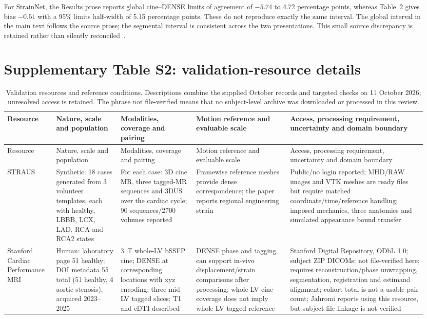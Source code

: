 \documentclass[11pt,a4paper]{article}
\begin{document}
For StrainNet, the Results prose reports global cine--DENSE limits of agreement of \(-5.74\) to 4.72 percentage points, whereas Table~2 gives bias \(-0.51\) with a 95\% limits half-width of 5.15 percentage points. These do not reproduce exactly the same interval. The global interval in the main text follows the source prose; the segmental interval is consistent across the two presentations. This small source discrepancy is retained rather than silently reconciled~\cite{wang2023strainnet}.

\section*{Supplementary Table S2: validation-resource details}

{\scriptsize\sloppy
\begin{longtable}{L{0.11\textwidth}L{0.14\textwidth}L{0.15\textwidth}L{0.17\textwidth}L{0.23\textwidth}}
\caption{Validation resources and reference conditions. Descriptions combine the supplied October records and targeted checks on 11 October 2026; unresolved access is retained. The phrase not file-verified means that no subject-level archive was downloaded or processed in this review.}\\
\toprule
Resource & Nature, scale and population & Modalities, coverage and pairing & Motion reference and evaluable scale & Access, processing requirement, uncertainty and domain boundary \\
\midrule
\endfirsthead
\toprule
Resource & Nature, scale and population & Modalities, coverage and pairing & Motion reference and evaluable scale & Access, processing requirement, uncertainty and domain boundary \\
\midrule
\endhead
STRAUS~\cite{zhou2018straus,strausdata} & Synthetic: 18 cases generated from 3 volunteer templates, each with healthy, LBBB, LCX, LAD, RCA and RCA2 states & For each case: 3D cine MR, three tagged-MR sequences and 3DUS over the cardiac cycle; 90 sequences/2700 volumes reported & Framewise reference meshes provide dense correspondence; the paper reports regional engineering strain & Public/no login reported; MHD/RAW images and VTK meshes are ready files but require matched coordinate/time/reference handling; imposed mechanics, three anatomies and simulated appearance bound transfer \\
\addlinespace
Stanford Cardiac Performance MRI~\cite{stanforddata} & Human: laboratory page 51 healthy; DOI metadata 55 total (51 healthy, 4 aortic stenosis), acquired 2023--2025 & 3~T whole-LV bSSFP cine; DENSE at corresponding locations with xyz encoding; three mid-LV tagged slices; T1 and cDTI described & DENSE phase and tagging can support in-vivo displacement/strain comparisons after processing; whole-LV cine coverage does not imply whole-LV tagged reference & Stanford Digital Repository, ODbL 1.0; subject ZIP DICOMs; not file-verified here; requires reconstruction/phase unwrapping, segmentation, registration and estimand alignment; cohort total is not a usable-pair count; Jahromi reports using this resource, but subject-file linkage is not verified \\

\end{longtable}}
\end{document}
